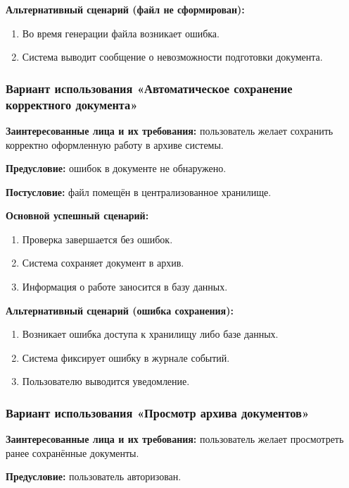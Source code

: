 \textbf{Альтернативный сценарий (файл не сформирован):}

\begin{enumerate}
	\item Во время генерации файла возникает ошибка.
	\item Система выводит сообщение о невозможности подготовки документа.
\end{enumerate}

\subsubsection{Вариант использования «Автоматическое сохранение корректного документа»}

\textbf{Заинтересованные лица и их требования:} пользователь желает сохранить корректно оформленную работу в архиве системы.

\textbf{Предусловие:} ошибок в документе не обнаружено.

\textbf{Постусловие:} файл помещён в централизованное хранилище.

\textbf{Основной успешный сценарий:}

\begin{enumerate}
	\item Проверка завершается без ошибок.
	\item Система сохраняет документ в архив.
	\item Информация о работе заносится в базу данных.
\end{enumerate}

\textbf{Альтернативный сценарий (ошибка сохранения):}

\begin{enumerate}
	\item Возникает ошибка доступа к хранилищу либо базе данных.
	\item Система фиксирует ошибку в журнале событий.
	\item Пользователю выводится уведомление.
\end{enumerate}

\subsubsection{Вариант использования «Просмотр архива документов»}

\textbf{Заинтересованные лица и их требования:} пользователь желает просмотреть ранее сохранённые документы.

\textbf{Предусловие:} пользователь авторизован.

